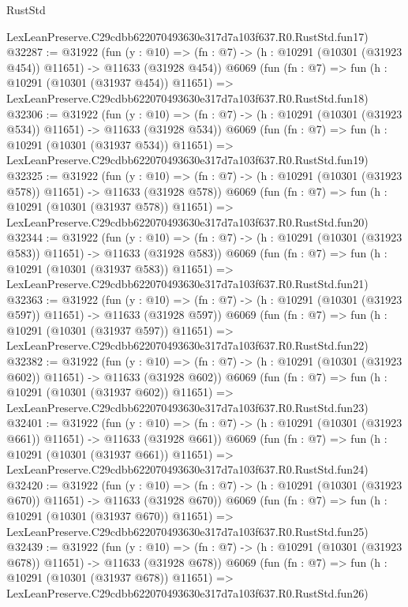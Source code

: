 \begin{lexlean}{RustStd}
\begin{coremodule}
    LexLeanPreserve.C29cdbb622070493630e317d7a103f637.R0.RustStd.fun17)
@32287 := @31922
    (fun (y : @10) =>
    (fn : @7) -> (h : @10291 (@10301 (@31923 @454)) @11651) -> @11633 (@31928 @454))
    @6069
    (fun (fn : @7) =>
    fun (h : @10291 (@10301 (@31937 @454)) @11651) =>
    LexLeanPreserve.C29cdbb622070493630e317d7a103f637.R0.RustStd.fun18)
@32306 := @31922
    (fun (y : @10) =>
    (fn : @7) -> (h : @10291 (@10301 (@31923 @534)) @11651) -> @11633 (@31928 @534))
    @6069
    (fun (fn : @7) =>
    fun (h : @10291 (@10301 (@31937 @534)) @11651) =>
    LexLeanPreserve.C29cdbb622070493630e317d7a103f637.R0.RustStd.fun19)
@32325 := @31922
    (fun (y : @10) =>
    (fn : @7) -> (h : @10291 (@10301 (@31923 @578)) @11651) -> @11633 (@31928 @578))
    @6069
    (fun (fn : @7) =>
    fun (h : @10291 (@10301 (@31937 @578)) @11651) =>
    LexLeanPreserve.C29cdbb622070493630e317d7a103f637.R0.RustStd.fun20)
@32344 := @31922
    (fun (y : @10) =>
    (fn : @7) -> (h : @10291 (@10301 (@31923 @583)) @11651) -> @11633 (@31928 @583))
    @6069
    (fun (fn : @7) =>
    fun (h : @10291 (@10301 (@31937 @583)) @11651) =>
    LexLeanPreserve.C29cdbb622070493630e317d7a103f637.R0.RustStd.fun21)
@32363 := @31922
    (fun (y : @10) =>
    (fn : @7) -> (h : @10291 (@10301 (@31923 @597)) @11651) -> @11633 (@31928 @597))
    @6069
    (fun (fn : @7) =>
    fun (h : @10291 (@10301 (@31937 @597)) @11651) =>
    LexLeanPreserve.C29cdbb622070493630e317d7a103f637.R0.RustStd.fun22)
@32382 := @31922
    (fun (y : @10) =>
    (fn : @7) -> (h : @10291 (@10301 (@31923 @602)) @11651) -> @11633 (@31928 @602))
    @6069
    (fun (fn : @7) =>
    fun (h : @10291 (@10301 (@31937 @602)) @11651) =>
    LexLeanPreserve.C29cdbb622070493630e317d7a103f637.R0.RustStd.fun23)
@32401 := @31922
    (fun (y : @10) =>
    (fn : @7) -> (h : @10291 (@10301 (@31923 @661)) @11651) -> @11633 (@31928 @661))
    @6069
    (fun (fn : @7) =>
    fun (h : @10291 (@10301 (@31937 @661)) @11651) =>
    LexLeanPreserve.C29cdbb622070493630e317d7a103f637.R0.RustStd.fun24)
@32420 := @31922
    (fun (y : @10) =>
    (fn : @7) -> (h : @10291 (@10301 (@31923 @670)) @11651) -> @11633 (@31928 @670))
    @6069
    (fun (fn : @7) =>
    fun (h : @10291 (@10301 (@31937 @670)) @11651) =>
    LexLeanPreserve.C29cdbb622070493630e317d7a103f637.R0.RustStd.fun25)
@32439 := @31922
    (fun (y : @10) =>
    (fn : @7) -> (h : @10291 (@10301 (@31923 @678)) @11651) -> @11633 (@31928 @678))
    @6069
    (fun (fn : @7) =>
    fun (h : @10291 (@10301 (@31937 @678)) @11651) =>
    LexLeanPreserve.C29cdbb622070493630e317d7a103f637.R0.RustStd.fun26)

\end{coremodule}
\end{lexlean}
